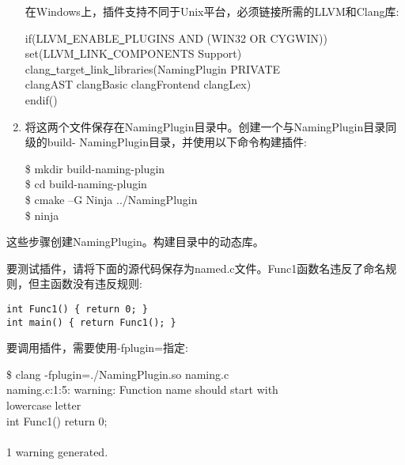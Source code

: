 \begin{enumerate}
在Windows上，插件支持不同于Unix平台，必须链接所需的LLVM和Clang库:
\begin{tcolorbox}[colback=white,colframe=black]
if(LLVM\underline{~}ENABLE\underline{~}PLUGINS AND (WIN32 OR CYGWIN)) \\
\hspace*{0.5cm}set(LLVM\underline{~}LINK\underline{~}COMPONENTS Support) \\
\hspace*{0.5cm}clang\underline{~}target\underline{~}link\underline{~}libraries(NamingPlugin PRIVATE \\
\hspace*{1cm}clangAST clangBasic clangFrontend clangLex) \\
endif()
\end{tcolorbox}

\item 将这两个文件保存在NamingPlugin目录中。创建一个与NamingPlugin目录同级的build- NamingPlugin目录，并使用以下命令构建插件:
\begin{tcolorbox}[colback=white,colframe=black]
\$ mkdir build-naming-plugin \\
\$ cd build-naming-plugin \\
\$ cmake –G Ninja ../NamingPlugin \\
\$ ninja
\end{tcolorbox}

\end{enumerate}

这些步骤创建NamingPlugin。构建目录中的动态库。\par

要测试插件，请将下面的源代码保存为named.c文件。Func1函数名违反了命名规则，但主函数没有违反规则:\par

\begin{lstlisting}[caption={}]
int Func1() { return 0; }
int main() { return Func1(); }
\end{lstlisting}

要调用插件，需要使用-fplugin=指定:\par

\begin{tcolorbox}[colback=white,colframe=black]
\$ clang -fplugin=./NamingPlugin.so naming.c \\
naming.c:1:5: warning: Function name should start with \\
lowercase letter \\
int Func1() { return 0; } \\
\hspace*{0.7cm}\^ \\
1 warning generated.
\end{tcolorbox}

